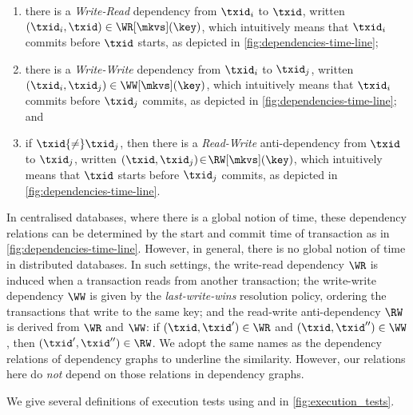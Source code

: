 \begin{enumerate} 
\item there is a \emph{Write-Read} dependency from \(\txid_{i}\) to \(\txid\), written \((\txid_{i},\txid) \in \WR[\mkvs](\key)\),
which intuitively means that \( \txid_{i} \) commits before \( \txid \) starts, as depicted in \cref{fig:dependencies-time-line};
\item there is a \emph{Write-Write} dependency from \(\txid_{i}\) to \(\txid_{j}\), 
written \((\txid_{i},\txid_{j}) \in \WW[\mkvs](\key) \),
which intuitively means that \( \txid_{i} \) commits before \( \txid_j \) commits, as depicted in \cref{fig:dependencies-time-line}; and 
\item if \(\txid {\neq} \txid_{j}\), then there is a \emph{Read-Write} anti-dependency from \(\txid\) to \(\txid_{j}\), written \((\txid,\txid_j) \!\in\! \RW[\mkvs](\key)\),
which intuitively means that \( \txid \) starts before \( \txid_j \) commits, as depicted in \cref{fig:dependencies-time-line}.
\end{enumerate}



\noindent 
In centralised databases, where there is a global notion of time, 
these dependency relations can be determined by the start and commit time of transaction as in \cref{fig:dependencies-time-line}.
However, in general, there is no global notion of time in distributed databases.
In such settings, the write-read dependency \( \WR \) is induced when a transaction reads from another transaction;
the write-write dependency \( \WW \) is given by the \emph{last-write-wins} resolution policy,
ordering the transactions that write to the same key; and
the read-write anti-dependency \( \RW \) is derived from \( \WR \) and \( \WW \):
if \( (\txid, \txid') \in \WR \) and \( (\txid, \txid'') \in \WW \), then \( (\txid',\txid'') \in \RW \).
We adopt the same names as the dependency relations of dependency graphs \citep{adya}
to underline the similarity.
However, our relations here do \emph{not} depend on those relations in dependency graphs.

We give several definitions of
execution tests using \vshiftname and \cancommitname in \cref{fig:execution_tests}. 



